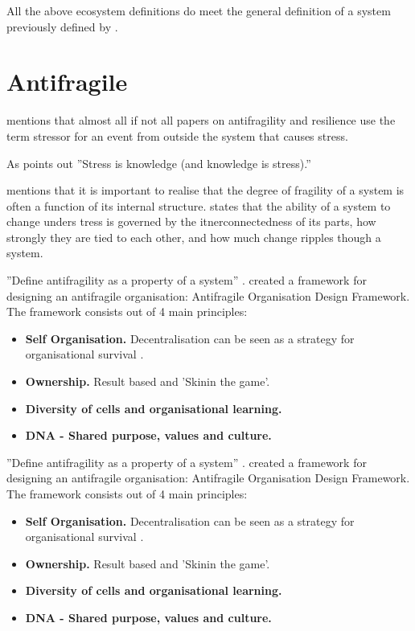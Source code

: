 All the above ecosystem definitions do meet the general definition of a system previously defined by \textcites{Ackoff1973}[p.~183]{Gharajedaghi2011}[p.~13--14]{Mannaert2016}.

\section{Antifragile}
\label{sec:tbantifragile}



\textcite[p. 32]{Botjes2020} mentions that almost all if not all papers on antifragility and resilience use the term stressor for an event from outside the system that causes stress.

As \textcite[p. 54]{Taleb2012} points out ''Stress is knowledge (and knowledge is stress).''

\textcite[p.~886]{OReilly2019} mentions that it is important to realise that the degree of fragility of a system is often a function of its internal structure. \textcite[p.~886]{OReilly2019} states that the ability of a system to change unders tress is governed by the itnerconnectedness of its parts, how strongly they are tied to each other, and how much change ripples though a system.

''Define antifragility as a property of a system'' \parencite{Jaaron2014}. \textcite{Kastner2017} created a framework for designing an antifragile organisation: Antifragile Organisation Design Framework. The framework consists out of 4 main principles:
\begin{itemize}
	\item{\textbf{Self Organisation.} Decentralisation can be seen as a strategy for organisational survival \parencite{Brafman2007}.}
	\item{\textbf{Ownership.} Result based and 'Skinin the game'.}
	\item{\textbf{Diversity of cells and organisational learning.}}
	\item{\textbf{DNA - Shared purpose, values and culture.}}
\end{itemize}

''Define antifragility as a property of a system'' \parencite{Jaaron2014}. \textcite{Kastner2017} created a framework for designing an antifragile organisation: Antifragile Organisation Design Framework. The framework consists out of 4 main principles:
\begin{itemize}
	\item{\textbf{Self Organisation.} Decentralisation can be seen as a strategy for organisational survival \parencite{Brafman2007}.}
	\item{\textbf{Ownership.} Result based and 'Skinin the game'.}
	\item{\textbf{Diversity of cells and organisational learning.}}
	\item{\textbf{DNA - Shared purpose, values and culture.}}
\end{itemize}

